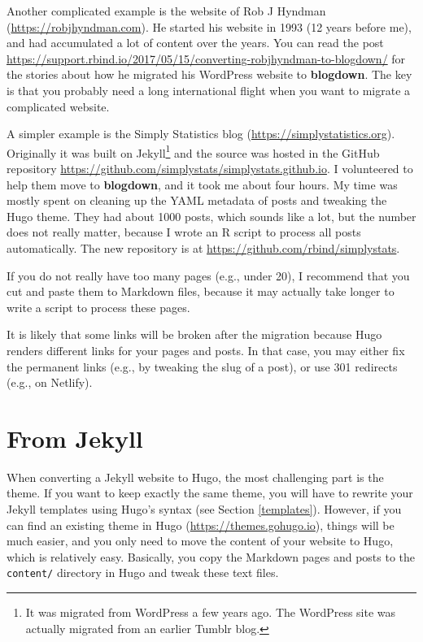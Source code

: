 \documentclass[12pt,]{krantz}
\theoremstyle{definition}
\theoremstyle{definition}
\theoremstyle{definition}
\theoremstyle{remark}
\begin{document}
Another complicated example is the website of Rob J Hyndman
(\url{https://robjhyndman.com}). He started his website in 1993 (12
years before me), and had accumulated a lot of content over the years.
You can read the post
\url{https://support.rbind.io/2017/05/15/converting-robjhyndman-to-blogdown/}
for the stories about how he migrated his WordPress website to
\textbf{blogdown}. The key is that you probably need a long
international flight when you want to migrate a complicated website.

A simpler example is the Simply Statistics blog
(\url{https://simplystatistics.org}). Originally it was built on
Jekyll\footnote{It was migrated from WordPress a few years ago. The
  WordPress site was actually migrated from an earlier Tumblr blog.} and
the source was hosted in the GitHub repository
\url{https://github.com/simplystats/simplystats.github.io}. I
volunteered to help them move to \textbf{blogdown}, and it took me about
four hours. My time was mostly spent on cleaning up the YAML metadata of
posts and tweaking the Hugo theme. They had about 1000 posts, which
sounds like a lot, but the number does not really matter, because I
wrote an R script to process all posts automatically. The new repository
is at \url{https://github.com/rbind/simplystats}.

If you do not really have too many pages (e.g., under 20), I recommend
that you cut and paste them to Markdown files, because it may actually
take longer to write a script to process these pages.

It is likely that some links will be broken after the migration because
Hugo renders different links for your pages and posts. In that case, you
may either fix the permanent links (e.g., by tweaking the slug of a
post), or use 301 redirects (e.g., on Netlify).

\hypertarget{from-jekyll}{%
\section{From Jekyll}\label{from-jekyll}}

When converting a Jekyll website to Hugo, the most
challenging part is the theme. If you want to keep exactly the same
theme, you will have to rewrite your Jekyll templates using Hugo's
syntax (see Section \ref{templates}). However, if you can find an
existing theme in Hugo (\url{https://themes.gohugo.io}), things will be
much easier, and you only need to move the content of your website to
Hugo, which is relatively easy. Basically, you copy the Markdown pages
and posts to the \texttt{content/} directory in Hugo and tweak these
text files.
\end{document}
